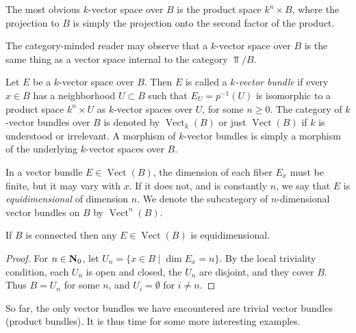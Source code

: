 \documentclass[a4paper,openany]{scrbook}
\DeclareMathOperator{\Vect}{Vect}
\begin{document}
The most obvious $k$-vector space over $B$ is the product space $k^n \times B$, where the projection to $B$ is simply the projection onto the second factor of the product.

\begin{remark}
	The category-minded reader may observe that a $k$-vector space over $B$ is the same thing as a vector space internal to the category $\Top/B$. 
\end{remark}

\begin{defn}
Let $E$ be a $k$-vector space over $B$. Then $E$ is called a \emph{$k$-vector bundle} if every $x \in B$ has a neighborhood $U \subset B$ such that $E_U = p^{-1}(U)$ is isomorphic to a product space $k^n \times U$ as $k$-vector spaces over $U$, for some $n \geq 0$. The category of $k$-vector bundles over $B$ is denoted by $\Vect_k(B)$ or just $\Vect(B)$ if $k$ is understood or irrelevant. A morphism of $k$-vector bundles is simply a morphism of the underlying $k$-vector spaces over $B$.
\end{defn}



In a vector bundle $E \in \Vect(B)$, the dimension of each fiber $E_x$ must be finite, but it may vary with $x$. If it does not, and is constantly $n$, we say that $E$ is \emph{equidimensional} of dimension $n$. We denote the subcategory of $n$-dimensional vector bundles on $B$ by $\Vect^n(B)$.

\begin{lemma}
If $B$ is connected then any $E \in \Vect(B)$ is equidimensional.
\end{lemma}
\begin{proof}
For $n \in \mathbf{N}_0$, let $U_n = \{ x \in B \mid \dim E_x = n\}$. By the local triviality condition, each $U_n$ is open and closed, the $U_n$ are disjoint, and they cover $B$. Thus $B=U_n$ for some $n$, and $U_i = \emptyset$ for $i \neq n$.
\end{proof}

So far, the only vector bundles we have encountered are trivial vector bundles (product bundles). It is thus time for some more interesting examples.
\end{document}
